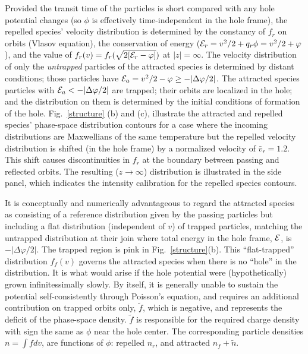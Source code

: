 \documentclass[aip,pop,article-title]{revtex4-2}
\def\energy{{\cal E}}
\begin{document}
Provided the transit time of the particles is short compared with any
hole potential changes (so $\phi$ is effectively time-independent in the hole
frame), the repelled species' velocity distribution is determined by
the constancy of $f_r$ on orbits (Vlasov equation), the conservation
of energy ($\energy_r=v^2/2+q_r\phi=v^2/2+\varphi $), and the value of
$f_r(v)=f_r(\sqrt{2[\energy_r-\varphi]})$ at $|z|=\infty$. The
velocity distribution of only the \emph{untrapped} particles of the
attracted species is determined by distant conditions; those particles
have $\energy_a=v^2/2-\varphi \ge -|\Delta\varphi/2|$. The attracted species particles
with $\energy_a< -|\Delta\varphi/2|$ are trapped; their orbits are localized in the
hole; and the distribution on them is determined by the initial
conditions of formation of the hole. Fig.\ \ref{structure} (b) and
(c), illustrate the attracted and repelled species' phase-space distribution
contours for a case where the incoming distributions are Maxwellians
of the same temperature but the repelled velocity distribution is
shifted (in the hole frame) by a normalized velocity of
$\bar v_r=1.2$. This shift causes discontinuities in $f_r$ at the boundary
between passing and reflected orbits. The resulting ($z\to\infty$)
distribution is illustrated in the side panel, which indicates the
intensity calibration for the repelled species contours.

It is conceptually and numerically advantageous to regard the
attracted species as consisting of a reference distribution given by
the passing particles but including a flat distribution (independent
of $v$) of trapped particles, matching the untrapped distribution at
their join where total energy in the hole frame, $\energy$, is
$-|\Delta\varphi/2|$. The trapped region is pink in Fig.\
\ref{structure}(b). This ``flat-trapped'' distribution $f_f(v)$
governs the attracted species when there is no ``hole'' in the
distribution. It is what would arise if the hole potential were
(hypothetically) grown infinitessimally slowly. By itself, it is
generally unable to sustain the potential self-consistently through
Poisson's equation, and requires an additional contribution on trapped
orbits only, $\tilde f$, which is negative, and represents the deficit
of the phase-space density.  $\tilde f$ is responsible for the
required charge density with sign the same as $\phi$ near the hole
center. The corresponding particle densities $n=\int f dv$, are
functions of $\phi$: repelled $n_r$, and attracted $n_f+\tilde n$.
\end{document}
